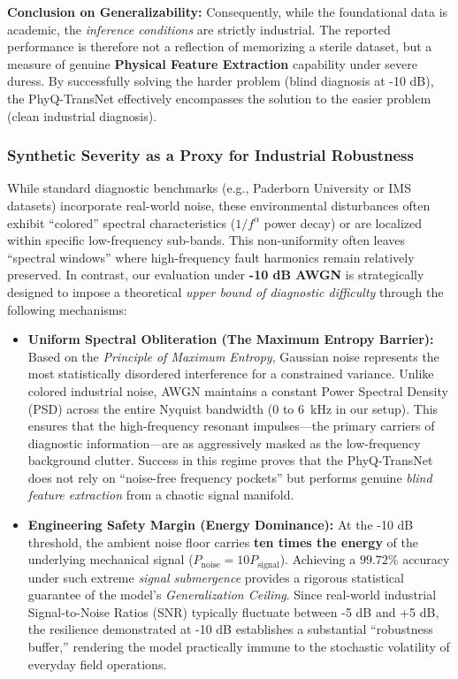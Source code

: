\documentclass[5p,times,twocolumn]{elsarticle}
\begin{document}
\textbf{Conclusion on Generalizability:}
Consequently, while the foundational data is academic, the \textit{inference conditions} are strictly industrial. The reported performance is therefore not a reflection of memorizing a sterile dataset, but a measure of genuine \textbf{Physical Feature Extraction} capability under severe duress. By successfully solving the harder problem (blind diagnosis at -10 dB), the PhyQ-TransNet effectively encompasses the solution to the easier problem (clean industrial diagnosis).

\subsubsection{Synthetic Severity as a Proxy for Industrial Robustness}
While standard diagnostic benchmarks (e.g., Paderborn University or IMS datasets) incorporate real-world noise, these environmental disturbances often exhibit ``colored'' spectral characteristics ($1/f^\alpha$ power decay) or are localized within specific low-frequency sub-bands. This non-uniformity often leaves ``spectral windows'' where high-frequency fault harmonics remain relatively preserved. In contrast, our evaluation under \textbf{-10 dB AWGN} is strategically designed to impose a theoretical \textit{upper bound of diagnostic difficulty} through the following mechanisms:

\begin{itemize}
    \item \textbf{Uniform Spectral Obliteration (The Maximum Entropy Barrier):} 
    Based on the \textit{Principle of Maximum Entropy}, Gaussian noise represents the most statistically disordered interference for a constrained variance. Unlike colored industrial noise, AWGN maintains a constant Power Spectral Density (PSD) across the entire Nyquist bandwidth (0 to \SI{6}{kHz} in our setup). This ensures that the high-frequency resonant impulses---the primary carriers of diagnostic information---are as aggressively masked as the low-frequency background clutter. Success in this regime proves that the PhyQ-TransNet does not rely on ``noise-free frequency pockets'' but performs genuine \textit{blind feature extraction} from a chaotic signal manifold.

    \item \textbf{Engineering Safety Margin (Energy Dominance):} 
    At the -10 dB threshold, the ambient noise floor carries \textbf{ten times the energy} of the underlying mechanical signal ($P_{\text{noise}} = 10 P_{\text{signal}}$). Achieving a $99.72\%$ accuracy under such extreme \textit{signal submergence} provides a rigorous statistical guarantee of the model's \textit{Generalization Ceiling}. Since real-world industrial Signal-to-Noise Ratios (SNR) typically fluctuate between -5 dB and +5 dB, the resilience demonstrated at -10 dB establishes a substantial ``robustness buffer,'' rendering the model practically immune to the stochastic volatility of everyday field operations.
\end{itemize}
\end{document}
